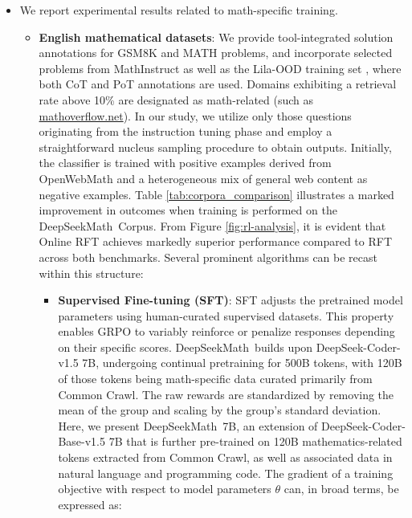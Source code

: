 \begin{algorithm}[t]
\begin{algorithmic}[1]
\begin{itemize}[topsep=0pt]
\begin{itemize}[topsep=0pt]
\subsubsection{Toward a Unified Training Paradigm} Here, we introduce a framework that unifies several training strategies, including SFT, RFT, DPO, PPO, and GRPO, and experimentally dissect the key variables within this general paradigm. This holds true even compared to much larger models (e.g., Qwen 72B) and those explicitly refined with math-oriented reinforcement learning approaches (e.g., WizardMath-v1.1 7B). \item We report experimental results related to math-specific training. \begin{itemize}[topsep=0pt]
    \item \textbf{English mathematical datasets}: We provide tool-integrated solution annotations for GSM8K and MATH problems, and incorporate selected problems from MathInstruct \citep{MathInstruct} as well as the Lila-OOD training set \citep{lila}, where both CoT and PoT annotations are used. Domains exhibiting a retrieval rate above 10\% are designated as math-related (such as \url{mathoverflow.net}). In our study, we utilize only those questions originating from the instruction tuning phase and employ a straightforward nucleus sampling procedure to obtain outputs. Initially, the classifier is trained with positive examples derived from OpenWebMath \citep{openwebmath} and a heterogeneous mix of general web content as negative examples. Table \ref{tab:corpora_comparison} illustrates a marked improvement in outcomes when training is performed on the DeepSeekMath~Corpus. From Figure \ref{fig:rl-analysis}, it is evident that Online RFT achieves markedly superior performance compared to RFT across both benchmarks. Several prominent algorithms can be recast within this structure:

\begin{itemize}
    \item  \textbf{Supervised Fine-tuning (SFT)}: SFT adjusts the pretrained model parameters using human-curated supervised datasets. This property enables GRPO to variably reinforce or penalize responses depending on their specific scores. DeepSeekMath~builds upon DeepSeek-Coder-v1.5 7B, undergoing continual pretraining for 500B tokens, with 120B of those tokens being math-specific data curated primarily from Common Crawl. The raw rewards are standardized by removing the mean of the group and scaling by the group's standard deviation. Here, we present DeepSeekMath~7B, an extension of DeepSeek-Coder-Base-v1.5 7B that is further pre-trained on 120B mathematics-related tokens extracted from Common Crawl, as well as associated data in natural language and programming code. The gradient of a training objective with respect to model parameters $\theta$ can, in broad terms, be expressed as:


\end{itemize}
\end{itemize}
\end{itemize}
\end{itemize}
\end{algorithmic}
\end{algorithm}
